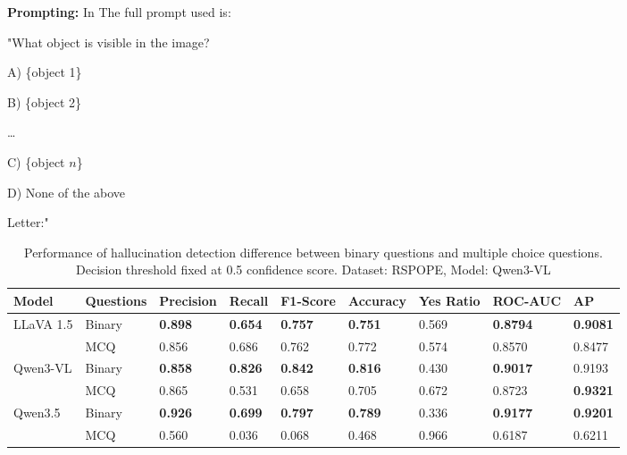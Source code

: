 \begin{description}
	\item \textbf{Prompting:}
	      In The full prompt used is:

	      "What object is visible in the image?

	      A) \{object 1\}

	      B) \{object 2\}

	      \dots

	      C) \{object $n$\}

	      D) None of the above

	      Letter:"

\end{description}


\begin{table}[htb] \caption{Performance of hallucination detection difference between binary questions and multiple choice questions. Decision threshold fixed at 0.5 confidence score. Dataset: RSPOPE, Model: Qwen3-VL} \centering
	\centering
	\begin{tabular}{lllllllll} %
		\toprule
		Model     & Questions & Precision      & Recall         & F1-Score       & Accuracy       & Yes Ratio & ROC-AUC         & AP              \\
		\midrule
		LLaVA 1.5 & Binary    & \textbf{0.898} & \textbf{0.654} & \textbf{0.757} & \textbf{0.751} & 0.569     & \textbf{0.8794} & \textbf{0.9081} \\
		          & MCQ       & 0.856          & 0.686          & 0.762          & 0.772          & 0.574     & 0.8570          & 0.8477          \\
		\midrule
		Qwen3-VL  & Binary    & \textbf{0.858} & \textbf{0.826} & \textbf{0.842} & \textbf{0.816} & 0.430     & \textbf{0.9017} & 0.9193          \\
		          & MCQ       & 0.865          & 0.531          & 0.658          & 0.705          & 0.672     & 0.8723          & \textbf{0.9321}          \\
		\midrule
		Qwen3.5   & Binary    & \textbf{0.926} & \textbf{0.699} & \textbf{0.797} & \textbf{0.789} & 0.336     & \textbf{0.9177} & \textbf{0.9201} \\
		          & MCQ       & 0.560          & 0.036          & 0.068          & 0.468          & 0.966     & 0.6187          & 0.6211          \\
		\bottomrule
	\end{tabular}
	\label{tab:enghistory_clean}
\end{table}
\FloatBarrier
